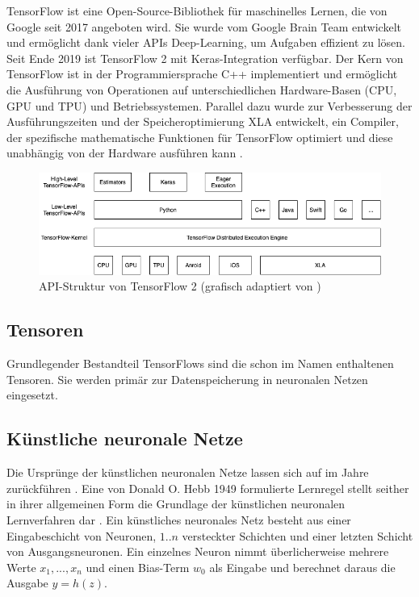 TensorFlow ist eine Open-Source-Bibliothek für maschinelles Lernen, die von Google seit 2017 angeboten wird. Sie wurde vom Google Brain Team entwickelt und ermöglicht dank vieler \acp{API} Deep-Learning, um Aufgaben effizient zu lösen. Seit Ende 2019 ist TensorFlow 2 mit Keras-Integration verfügbar. Der Kern von TensorFlow ist in der Programmiersprache C++ implementiert und ermöglicht die Ausführung von Operationen auf unterschiedlichen Hardware-Basen (\acs{CPU}, \ac{GPU} und \ac{TPU}) und Betriebssystemen.  Parallel dazu wurde zur Verbesserung der Ausführungszeiten und der Speicheroptimierung \ac{XLA} entwickelt, ein Compiler, der spezifische mathematische Funktionen für TensorFlow optimiert und diese unabhängig von der Hardware ausführen kann \cite[139\psq]{Deru2019}.

\begin{figure}[ht]
	\centering
	\includegraphics[width=\textwidth]{images/TF2-API-Struktur}
	\caption[TensorFlow API Struktur]{API-Struktur von TensorFlow 2 (grafisch adaptiert von \cite[140]{Deru2019}\cites{TfAPI})}
	\label{fig:tfstructure}
\end{figure}

\subsection{Tensoren}
Grundlegender Bestandteil TensorFlows sind die schon im Namen enthaltenen Tensoren. Sie werden primär zur Datenspeicherung in neuronalen Netzen eingesetzt. 

\subsection{Künstliche neuronale Netze}\label{sec:ann}

Die Ursprünge der künstlichen neuronalen Netze lassen sich auf \citeauthor{mcculloch_pitts} im Jahre \citeyear{mcculloch_pitts} zurückführen \cite{mcculloch_pitts}. Eine von Donald O. Hebb 1949 formulierte Lernregel stellt seither in ihrer allgemeinen Form die Grundlage der künstlichen neuronalen Lernverfahren dar \cite{Mainzer1997}. Ein künstliches neuronales Netz besteht aus einer Eingabeschicht von Neuronen, $1..n$ versteckter Schichten und einer letzten Schicht von Ausgangsneuronen. Ein einzelnes Neuron nimmt überlicherweise mehrere Werte $x_{1},...,x_{n}$ und einen \gls{Bias}-Term $w_{0}$ als Eingabe und berechnet daraus die Ausgabe $y=h(z)$.

